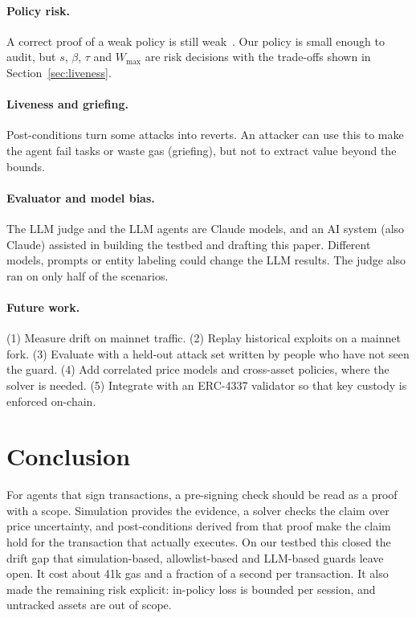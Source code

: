 \documentclass[11pt]{article}
\begin{document}
\paragraph{Policy risk.} A correct proof of a weak policy is still weak~\cite{sherlock2026fv}. Our policy is small enough to audit, but $s$, $\beta$, $\tau$ and $W_{\max}$ are risk decisions with the trade-offs shown in Section~\ref{sec:liveness}.

\paragraph{Liveness and griefing.} Post-conditions turn some attacks into reverts. An attacker can use this to make the agent fail tasks or waste gas (griefing), but not to extract value beyond the bounds.

\paragraph{Evaluator and model bias.} The LLM judge and the LLM agents are Claude models, and an AI system (also Claude) assisted in building the testbed and drafting this paper. Different models, prompts or entity labeling could change the LLM results. The judge also ran on only half of the scenarios.

\paragraph{Future work.} (1) Measure drift on mainnet traffic. (2) Replay historical exploits on a mainnet fork. (3) Evaluate with a held-out attack set written by people who have not seen the guard. (4) Add correlated price models and cross-asset policies, where the solver is needed. (5) Integrate with an ERC-4337 validator so that key custody is enforced on-chain.

\section{Conclusion}
For agents that sign transactions, a pre-signing check should be read as a proof with a scope. Simulation provides the evidence, a solver checks the claim over price uncertainty, and post-conditions derived from that proof make the claim hold for the transaction that actually executes. On our testbed this closed the drift gap that simulation-based, allowlist-based and LLM-based guards leave open. It cost about 41k gas and a fraction of a second per transaction. It also made the remaining risk explicit: in-policy loss is bounded per session, and untracked assets are out of scope.
\end{document}
